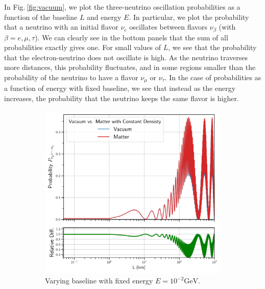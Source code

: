 \documentclass[twocolumn,secnumarabic,amssymb, nobibnotes, aps, prd,10pt]{revtex4-1}
\newcommand{\Fig}[1]{Fig.$\:$\ref{#1}}
\begin{document}
In \Fig{fig:vacuum}, we plot the three-neutrino oscillation probabilities as a function of
the baseline $L$ and energy $E$. In particular, we plot the probability that a neutrino
with an initial flavor $\nu_e$ oscillates between flavors $\nu_\beta$ (with $\beta = e,
\mu, \tau$). We can clearly see in the bottom panels that the sum of all probabilities
exactly gives one. For small values of $L$, we see that the probability that the 
electron-neutrino does not oscillate is high. As the neutrino traverses more distances,
this probability fluctuates, and in some regions smaller than the probability of the
neutrino to have a flavor $\nu_\mu$ or $\nu_\tau$. In the case of probabilities as a
function of energy with fixed baseline, we see that instead as the energy increases, the
probability that the neutrino keeps the same flavor is higher.
\begin{figure}
\captionsetup[subfigure]{aboveskip=-1.5pt,belowskip=-1.5pt} 
\begin{subfigure}{1.05\linewidth}
\includegraphics[width=\linewidth]{DistVacMatt.pdf}
\caption{Varying baseline with fixed energy $E=10^{-2} \mathrm{GeV}$.} 
\label{higgs:sspt} 
\end{subfigure} 
\\
\begin{subfigure}{1.05\linewidth}

\end{subfigure}
\end{figure}
\end{document}
